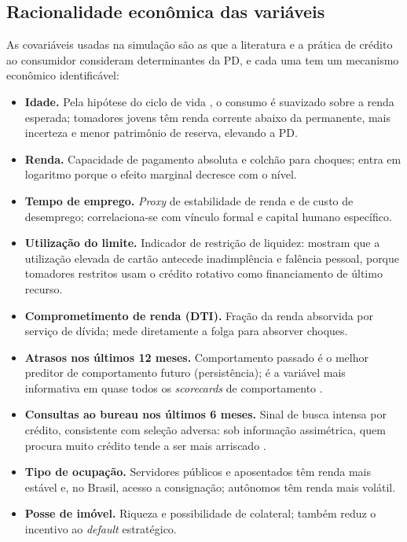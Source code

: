 \documentclass[11pt,a4paper]{article}
\begin{document}
\subsection{Racionalidade econômica das variáveis}
\label{sec:economia}

As covariáveis usadas na simulação são as que a literatura e a prática de crédito ao consumidor consideram determinantes da PD, e cada uma tem um mecanismo econômico identificável:

\begin{itemize}
\item \textbf{Idade.} Pela hipótese do ciclo de vida \citep{modigliani1954}, o consumo é suavizado sobre a renda esperada; tomadores jovens têm renda corrente abaixo da permanente, mais incerteza e menor patrimônio de reserva, elevando a PD.
\item \textbf{Renda.} Capacidade de pagamento absoluta e colchão para choques; entra em logaritmo porque o efeito marginal decresce com o nível.
\item \textbf{Tempo de emprego.} \emph{Proxy} de estabilidade de renda e de custo de desemprego; correlaciona-se com vínculo formal e capital humano específico.
\item \textbf{Utilização do limite.} Indicador de restrição de liquidez: \citet{gross2002} mostram que a utilização elevada de cartão antecede inadimplência e falência pessoal, porque tomadores restritos usam o crédito rotativo como financiamento de último recurso.
\item \textbf{Comprometimento de renda (DTI).} Fração da renda absorvida por serviço de dívida; mede diretamente a folga para absorver choques.
\item \textbf{Atrasos nos últimos 12 meses.} Comportamento passado é o melhor preditor de comportamento futuro (persistência); é a variável mais informativa em quase todos os \emph{scorecards} de comportamento \citep{thomas2002}.
\item \textbf{Consultas ao bureau nos últimos 6 meses.} Sinal de busca intensa por crédito, consistente com seleção adversa: sob informação assimétrica, quem procura muito crédito tende a ser mais arriscado \citep{stiglitz1981}.
\item \textbf{Tipo de ocupação.} Servidores públicos e aposentados têm renda mais estável e, no Brasil, acesso a consignação; autônomos têm renda mais volátil.
\item \textbf{Posse de imóvel.} Riqueza e possibilidade de colateral; também reduz o incentivo ao \emph{default} estratégico.
\end{itemize}
\end{document}
